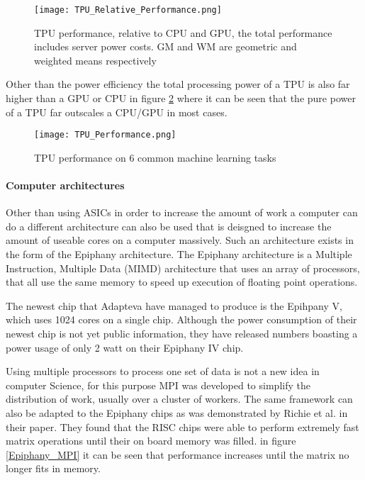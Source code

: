 \begin{figure}
  \texttt{[image: TPU\_Relative\_Performance.png]}
  \caption{TPU performance, relative to CPU and GPU, the total performance includes server power costs. GM and WM are geometric and weighted means respectively \cite{Joup17}}
  \label{TPU_Relative_Performance}
\end{figure}

Other than the power efficiency the total processing power of a TPU is also far higher
than a GPU or CPU in figure \ref{TPU_Performance} where it can be seen that the pure
power of a TPU far outscales a CPU/GPU in most cases.

\begin{figure}
  \texttt{[image: TPU\_Performance.png]}
  \caption{TPU performance on 6 common machine learning tasks\cite{Sato17}}
  \label{TPU_Performance}
\end{figure}


\paragraph{Computer architectures}
Other than using ASICs in order to increase the amount of work a computer can do
a different architecture can also be used that is deisgned to increase the amount
of useable cores on a computer massively. Such an architecture exists in the form
of the Epiphany architecture. The Epiphany architecture is a Multiple Instruction,
Multiple Data (MIMD) architecture that uses an array of processors, that all use the
same memory to speed up execution of floating point operations\cite{Olof16}.

The newest chip that Adapteva have managed to produce is the Epihpany V, which uses
1024 cores on a single chip\cite{Olof16}. Although the power consumption of their newest chip
is not yet public information, they have released numbers boasting a power usage of
only 2 watt on their Epiphany IV chip\cite{Adap}.

Using multiple processors to process one set of data is not a new idea in computer
Science, for this purpose MPI was developed to simplify the distribution of work,
usually over a cluster of workers. The same framework can also be adapted to the
Epiphany chips as was demonstrated by Richie et al. in their paper. They found that
the RISC chips were able to perform extremely fast matrix operations until their on board
memory was filled\cite{Rich15}. in figure \ref{Epiphany_MPI} it can be seen that performance increases
until the matrix no longer fits in memory.

